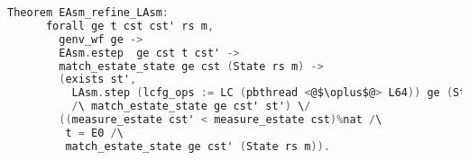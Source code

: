 \begin{lstlisting}[language=C]
    Theorem EAsm_refine_LAsm:
      forall ge t cst cst' rs m, 
        genv_wf ge ->
        EAsm.estep  ge cst t cst' -> 
        match_estate_state ge cst (State rs m) ->
        (exists st',
          LAsm.step (lcfg_ops := LC (pbthread <@$\oplus$@> L64)) ge (State rs m) t st'
          /\ match_estate_state ge cst' st') \/
        ((measure_estate cst' < measure_estate cst)%nat /\
         t = E0 /\
         match_estate_state ge cst' (State rs m)).
\end{lstlisting}
%
%
%

